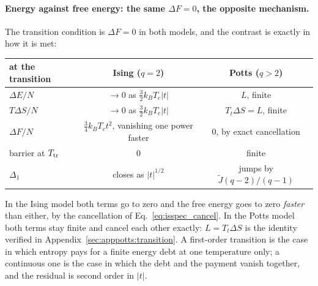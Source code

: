 \documentclass[10pt,a4paper]{article}
\theoremstyle{remark}
\begin{document}
\paragraph{Energy against free energy: the same $\Delta F=0$, the opposite
mechanism.} The transition condition is $\Delta F=0$ in both models, and the
contrast is exactly in how it is met:
\begin{center}
\begin{tabular}{lcc}
\toprule
at the transition & Ising ($q=2$) & Potts ($q>2$) \\
\midrule
$\Delta E/N$        & $\to0$ as $\tfrac32k_BT_c|t|$ & $L$, finite \\
$T\Delta S/N$       & $\to0$ as $\tfrac32k_BT_c|t|$ & $T_t\Delta S=L$, finite \\
$\Delta F/N$        & $\tfrac34k_BT_ct^{2}$, vanishing one power faster & $0$, by exact cancellation \\
barrier at $T_{\rm tr}$ & $0$ & finite \\
$\Delta_1$          & closes as $|t|^{1/2}$ & jumps by $\tilde J(q-2)/(q-1)$ \\
\bottomrule
\end{tabular}
\end{center}
In the Ising model both terms go to zero and the free energy goes to zero
\emph{faster} than either, by the cancellation of Eq.~\eqref{eq:isspec_cancel}.
In the Potts model both terms stay finite and cancel each other exactly:
$L=T_t\Delta S$ is the identity verified in
Appendix~\ref{sec:apppotts:transition}. A first-order transition is the case in
which entropy pays for a finite energy debt at one temperature only; a continuous
one is the case in which the debt and the payment vanish together, and the
residual is second order in $|t|$.
\end{document}
